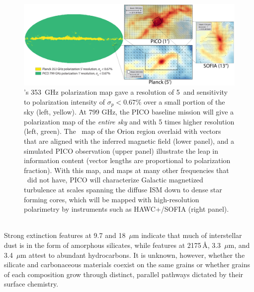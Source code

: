 \documentclass[PICOReport.tex]{subfiles}
\begin{document}
%
%
\begin{figure}
    \centering
    \includegraphics[width=6.5in]{images/galsci_fig_v4.pdf}
    \caption{\captiontext  \planck 's 353~GHz polarization map gave a resolution of 5\arcmin~and sensitivity to polarization intensity of $\sigma_{p} < 0.67\%$ over a small portion of the sky (left, yellow).  At 799 GHz, the PICO baseline mission will give a polarization map of the {\it entire sky} and with 5 times higher resolution (left, green). The \planck~map of the Orion region overlaid with vectors that are aligned with the inferred magnetic field (lower panel), and a simulated PICO observation (upper panel) illustrate the leap in information content (vector lengths are proportional to polarization fraction). With this map, and maps at many other frequencies that \planck~did not have, PICO will characterize Galactic magnetized turbulence at scales spanning the diffuse ISM down to dense star forming cores, which will be mapped with high-resolution polarimetry by instruments such as HAWC+/SOFIA \citep{Chuss2018} (right panel).}
    \label{fig:allsky}
\end{figure}

 \\
Strong extinction features at 9.7 and 18~$\mu$m indicate that much of interstellar dust is in the form of amorphous silicates, while features at 2175\,\AA, 3.3~$\mu$m, and 3.4~$\mu$m attest to abundant hydrocarbons. It is unknown, however, whether the silicate and carbonaceous materials coexist on the same grains or whether grains of each composition grow through distinct, parallel pathways dictated by their surface chemistry. 
\end{document}
